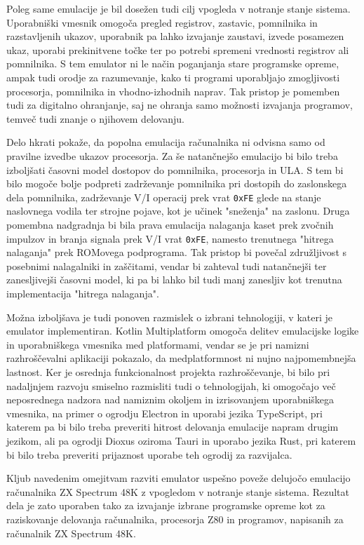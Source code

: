 \documentclass[a4paper, 12pt, openright]{book}
\begin{document}
    Poleg same emulacije je bil dosežen tudi cilj vpogleda v notranje stanje
    sistema. Uporabniški vmesnik omogoča pregled registrov, zastavic, pomnilnika in
    razstavljenih ukazov, uporabnik pa lahko izvajanje zaustavi, izvede posamezen
    ukaz, uporabi prekinitvene točke ter po potrebi spremeni vrednosti registrov
    ali pomnilnika. S tem emulator ni le način poganjanja stare programske opreme,
    ampak tudi orodje za razumevanje, kako ti programi uporabljajo zmogljivosti procesorja,
    pomnilnika in vhodno-izhodnih naprav. Tak pristop je pomemben tudi za digitalno
    ohranjanje, saj ne ohranja samo možnosti izvajanja programov, temveč tudi znanje
    o njihovem delovanju.

    Delo hkrati pokaže, da popolna emulacija računalnika ni odvisna samo od
    pravilne izvedbe ukazov procesorja. Za še natančnejšo emulacijo bi bilo treba
    izboljšati časovni model dostopov do pomnilnika, procesorja in ULA. S tem bi bilo
    mogoče bolje podpreti zadrževanje pomnilnika pri dostopih do zaslonskega dela
    pomnilnika, zadrževanje V/I operacij prek vrat \texttt{0xFE} glede na stanje naslovnega
    vodila ter strojne pojave, kot je učinek "sneženja" na zaslonu. Druga pomembna
    nadgradnja bi bila prava emulacija nalaganja kaset prek zvočnih impulzov in branja
    signala prek V/I vrat \texttt{0xFE}, namesto trenutnega "hitrega nalaganja" prek
    ROMovega podprograma. Tak pristop bi povečal združljivost s posebnimi
    nalagalniki in zaščitami, vendar bi zahteval tudi natančnejši ter zanesljivejši
    časovni model, ki pa bi lahko bil tudi manj zanesljiv kot trenutna
    implementacija "hitrega nalaganja".

    Možna izboljšava je tudi ponoven razmislek o izbrani tehnologiji, v kateri je
    emulator implementiran. Kotlin Multiplatform omogoča delitev emulacijske
    logike in uporabniškega vmesnika med platformami, vendar se je pri namizni razhroščevalni
    aplikaciji pokazalo, da medplatformnost ni nujno najpomembnejša lastnost. Ker
    je osrednja funkcionalnost projekta razhroščevanje, bi bilo pri nadaljnjem
    razvoju smiselno razmisliti tudi o tehnologijah, ki omogočajo več neposrednega
    nadzora nad namiznim okoljem in izrisovanjem uporabniškega vmesnika, na
    primer o ogrodju Electron in uporabi jezika TypeScript, pri katerem pa bi bilo
    treba preveriti hitrost delovanja emulacije napram drugim jezikom, ali pa
    ogrodji Dioxus oziroma Tauri in uporabo jezika Rust, pri katerem bi bilo treba
    preveriti prijaznost uporabe teh ogrodij za razvijalca.

    Kljub navedenim omejitvam razviti emulator uspešno poveže delujočo emulacijo računalnika
    ZX Spectrum 48K z vpogledom v notranje stanje sistema. Rezultat dela je zato
    uporaben tako za izvajanje izbrane programske opreme kot za raziskovanje
    delovanja računalnika, procesorja Z80 in programov, napisanih za računalnik
    ZX Spectrum 48K.


    \printbibliography
    [heading=bibintoc]
\end{document}

